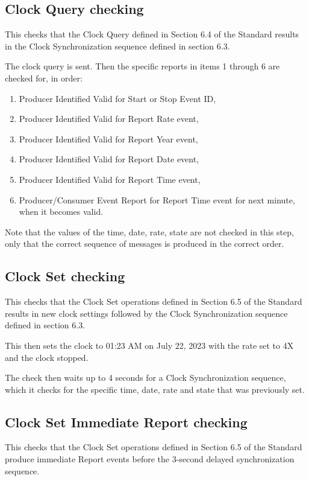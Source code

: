 \subsection{Clock Query checking}

This checks that the Clock Query defined in Section 6.4 of the Standard results in the
Clock Synchronization sequence defined in section 6.3.

The clock query is sent.
Then the specific reports in items 1 through 6 are checked for, in order:
\begin{enumerate}
\item Producer Identified Valid for Start or Stop Event ID,
\item Producer Identified Valid for Report Rate event,
\item Producer Identified Valid for Report Year event,
\item Producer Identified Valid for Report Date event,
\item Producer Identified Valid for Report Time event,
\item Producer/Consumer Event Report for Report Time event for next minute, when it becomes valid.
\end{enumerate}

Note that the values of the time, date, rate, state are not checked in this step,
only that the correct sequence of messages is produced in the correct order.

\subsection{Clock Set checking}

This checks that the Clock Set operations defined in Section 6.5 of the Standard results
in new clock settings followed by the
Clock Synchronization sequence defined in section 6.3.

This then sets the clock to 01:23 AM on July 22, 2023 with the rate set to 4X and the clock stopped.

The check then waits up to 4 seconds for a Clock Synchronization sequence, which it checks for
the specific time, date, rate and state that was previously set.

\subsection{Clock Set Immediate Report checking}

This checks that the Clock Set operations defined in Section 6.5 of the Standard produce
immediate Report events before the 3-second delayed synchronization sequence.

